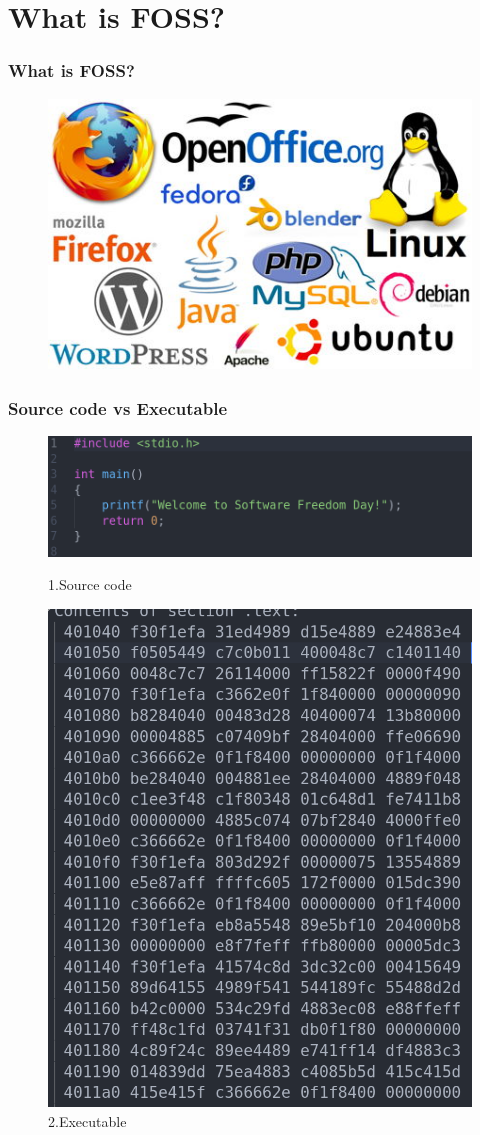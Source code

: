 \documentclass{beamer}
\begin{document}
	\section{What is FOSS?} 
	\begin{frame}\frametitle{What is FOSS?}
		\begin{figure}
			\includegraphics[scale =0.6]{sfoss}
		\end{figure}
	\end{frame}
	\begin{frame} \frametitle{Source code vs Executable}
	\begin{figure}
		\begin{center}
			\includegraphics[width=0.5\linewidth]{welcomec.png}
			\caption{1.Source code}
		\end{center}
		\includegraphics[width=0.3\linewidth]{welcomeobj.png}
		\caption{2.Executable}
	\end{figure}
\end{frame}
\end{document}
